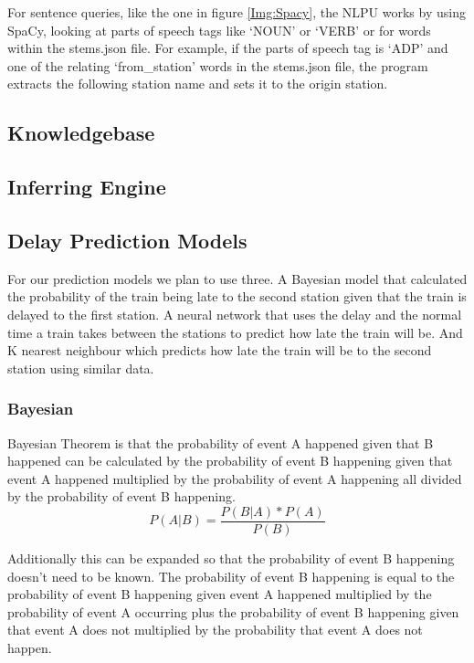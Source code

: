 \documentclass[11pt]{article}
\begin{document}
	For sentence queries, like the one in figure \ref{Img:Spacy}, the NLPU works by using SpaCy, looking at parts of speech tags like `NOUN' or `VERB' or for words within the stems.json file. For example, if the parts of speech tag is `ADP' and one of the relating `from\_station' words in the stems.json file, the program extracts the following station name and sets it to the origin station. 
	
	\subsection{Knowledgebase}
	
	\subsection{Inferring Engine}
	
	\subsection{Delay Prediction Models}
	
	For our prediction models we plan to use three. A Bayesian model that calculated the probability of the train being late to the second station given that the train is delayed to the first station. A neural network that uses the delay and the normal time a train takes between the stations to predict how late the train will be. And K nearest neighbour which predicts how late the train will be to the second station using similar data.
	
	\subsubsection{Bayesian}
	
	Bayesian Theorem is that the probability of event A happened given that B happened can be calculated by the probability of event B happening given that event A happened multiplied by the probability of event A happening all divided by the probability of event B happening.	
	\[P(A|B) = \frac{P(B|A) * P(A)}{P(B)}\]
	
	Additionally this can be expanded so that the probability of event B happening doesn't need to be known. 
	The probability of event B happening is equal to the probability of event B happening given event A happened multiplied by the probability of event A occurring plus the probability of event B happening given that event A does not multiplied by the probability that event A does not happen.
	
\end{document}
